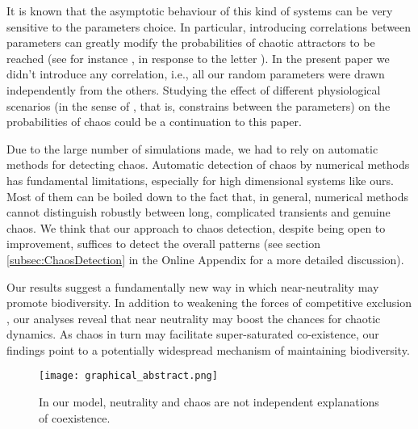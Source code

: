 It is known that the asymptotic behaviour of this kind of systems can be very sensitive to the parameters choice. In particular, introducing correlations between parameters can greatly modify the probabilities of chaotic attractors to be reached (see for instance \cite{Huisman2001}, in response to the letter \cite{Schippers2001}). In the present paper we didn't introduce any correlation, i.e., all our random parameters were drawn independently from the others. Studying the effect of different physiological scenarios (in the sense of \cite{Huisman2001}, that is, constrains between the parameters) on the probabilities of chaos could be a continuation to this paper.

Due to the large number of simulations made, we had to rely on automatic methods for detecting chaos. Automatic detection of chaos by numerical methods has fundamental limitations, especially for high dimensional systems like ours. Most of them can be boiled down to the fact that, in general, numerical methods cannot distinguish robustly between long, complicated transients and genuine chaos. We think that our approach to chaos detection, despite being open to improvement, suffices to detect the overall patterns (see section \ref{subsec:ChaosDetection} in the Online Appendix for a more detailed discussion).

Our results suggest a fundamentally new way in which near-neutrality may promote biodiversity. In addition to weakening the forces of competitive exclusion \cite{Scheffer2018}, our analyses reveal that near neutrality may boost the chances for chaotic dynamics. As chaos in turn may facilitate super-saturated co-existence, our findings point to a potentially widespread mechanism of maintaining biodiversity.

\begin{figure}
	\begin{center}
		\texttt{[image: graphical\_abstract.png]}
	\end{center}
	\caption{In our model, neutrality and chaos are not independent explanations of coexistence.}
	\label{fig:GapInKnowledge}
\end{figure}
